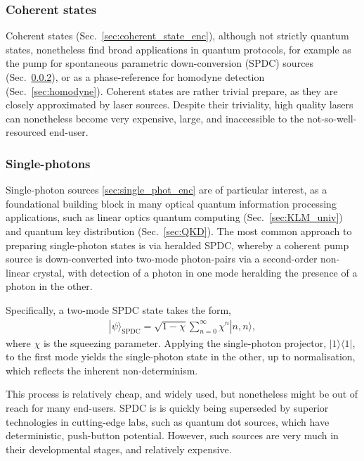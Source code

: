 \documentclass[aps,rmp,twocolumn,amsmath,amssymb,nofootinbib,superscriptaddress]{revtex4}
\newcommand{\bra}[1]{\langle#1|}
\newcommand{\ket}[1]{|#1\rangle}
\begin{document}
%
%

\subsubsection{Coherent states} \label{sec:coherent_states}

Coherent states (Sec.~\ref{sec:coherent_state_enc}), although not strictly quantum states, nonetheless find broad applications in quantum protocols, for example as the pump for spontaneous parametric down-conversion (SPDC) sources (Sec.~\ref{sec:single_phot_src}), or as a phase-reference for homodyne detection (Sec.~\ref{sec:homodyne}). Coherent states are rather trivial prepare, as they are closely approximated by laser sources. Despite their triviality, high quality lasers can nonetheless become very expensive, large, and inaccessible to the not-so-well-resourced end-user.

%
%

\subsubsection{Single-photons} \label{sec:single_phot_src}

Single-photon sources \ref{sec:single_phot_enc} are of particular interest, as a foundational building block in many optical quantum information processing applications, such as linear optics quantum computing (Sec.~\ref{sec:KLM_univ}) and quantum key distribution (Sec.~\ref{sec:QKD}). The most common approach to preparing single-photon states is via heralded SPDC, whereby a coherent pump source is down-converted into two-mode photon-pairs via a second-order non-linear crystal, with detection of a photon in one mode heralding the presence of a photon in the other.

Specifically, a two-mode SPDC state takes the form,
\begin{align}
\ket\psi_\mathrm{SPDC} = \sqrt{1-\chi} \sum_{n=0}^\infty \chi^n \ket{n,n},
\end{align}
where $\chi$ is the squeezing parameter. Applying the single-photon projector, \mbox{$\ket{1}\bra{1}$}, to the first mode yields the single-photon state in the other, up to normalisation, which reflects the inherent non-determinism.

This process is relatively cheap, and widely used, but nonetheless might be out of reach for many end-users. SPDC is is quickly being superseded by superior technologies in cutting-edge labs, such as quantum dot sources, which have deterministic, push-button potential. However, such sources are very much in their developmental stages, and relatively expensive.
\end{document}
